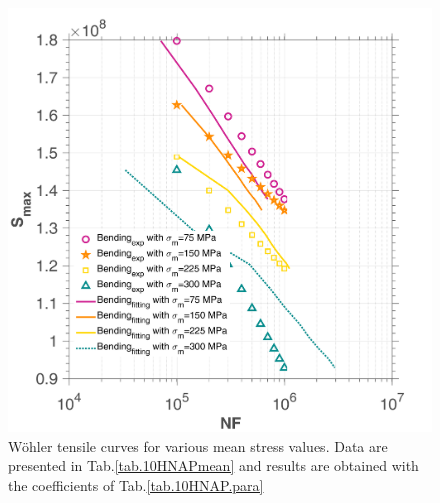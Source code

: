 \begin{figure}[!h]
	\centering
	\includegraphics[width=\textwidth]{figures//10HNAP_b1D_m_sn.png} 
	\caption{Wöhler tensile curves for various mean stress values. Data are presented in Tab.\ref{tab.10HNAPmean} and results are obtained with the coefficients of Tab.\ref{tab.10HNAP.para}}
	\label{fig.b1Dm10HNAPsn}
\end{figure}


